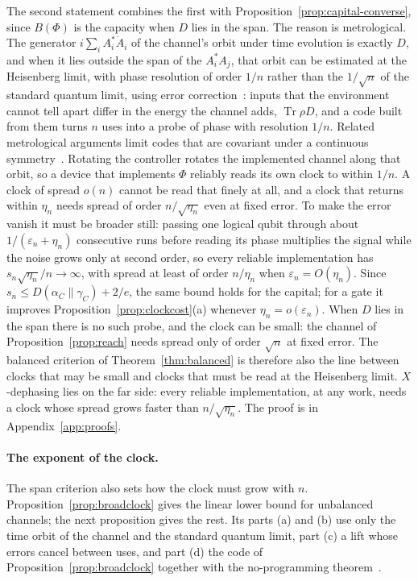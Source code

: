 \documentclass[11pt]{article}
\theoremstyle{definition}
\theoremstyle{remark}
\newcommand{\Tr}{\operatorname{Tr}}
\begin{document}
The second statement combines the first with Proposition~\ref{prop:capital-converse}, since $B(\Phi)$ is the capacity when $D$ lies in the span. The reason is metrological. The generator $i\sum_iA_i^*\dot A_i$ of the channel's orbit under time evolution is exactly $D$, and when it lies outside the span of the $A_i^*A_j$, that orbit can be estimated at the Heisenberg limit, with phase resolution of order $1/n$ rather than the $1/\sqrt n$ of the standard quantum limit, using error correction~\cite{DemkowiczCzajkowskiSekatski17,ZhouZhangPreskillJiang18,ZhouJiang21}: inputs that the environment cannot tell apart differ in the energy the channel adds, $\Tr\rho D$, and a code built from them turns $n$ uses into a probe of phase with resolution $1/n$. Related metrological arguments limit codes that are covariant under a continuous symmetry~\cite{KubicaDemkowicz21,ZhouLiuJiang21}. Rotating the controller rotates the implemented channel along that orbit, so a device that implements $\Phi$ reliably reads its own clock to within $1/n$. A clock of spread $o(n)$ cannot be read that finely at all, and a clock that returns within $\eta_n$ needs spread of order $n/\sqrt{\eta_n}$ even at fixed error. To make the error vanish it must be broader still: passing one logical qubit through about $1/(\varepsilon_n+\eta_n)$ consecutive runs before reading its phase multiplies the signal while the noise grows only at second order, so every reliable implementation has $s_n\sqrt{\eta_n}/n\to\infty$, with spread at least of order $n/\eta_n$ when $\varepsilon_n=O(\eta_n)$. Since $s_n\le D(\alpha_C\|\gamma_C)+2/e$, the same bound holds for the capital; for a gate it improves Proposition~\ref{prop:clockcost}(a) whenever $\eta_n=o(\varepsilon_n)$. When $D$ lies in the span there is no such probe, and the clock can be small: the channel of Proposition~\ref{prop:reach} needs spread only of order $\sqrt n$ at fixed error. The balanced criterion of Theorem~\ref{thm:balanced} is therefore also the line between clocks that may be small and clocks that must be read at the Heisenberg limit. $X$-dephasing lies on the far side: every reliable implementation, at any work, needs a clock whose spread grows faster than $n/\sqrt{\eta_n}$. The proof is in Appendix~\ref{app:proofs}.

\paragraph{The exponent of the clock.} The span criterion also sets how the clock must grow with $n$. Proposition~\ref{prop:broadclock} gives the linear lower bound for unbalanced channels; the next proposition gives the rest. Its parts (a) and (b) use only the time orbit of the channel and the standard quantum limit, part (c) a lift whose errors cancel between uses, and part (d) the code of Proposition~\ref{prop:broadclock} together with the no-programming theorem~\cite{NielsenChuang97,KubickiPalazuelosPerezGarcia19}.
\end{document}
